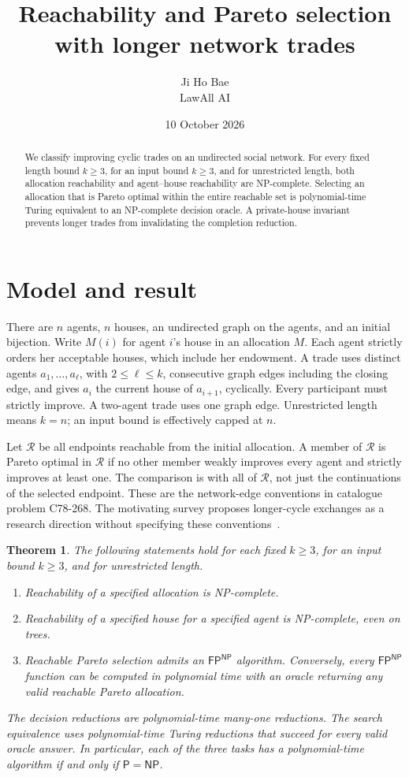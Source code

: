 \documentclass[11pt]{article}
\title{Reachability and Pareto selection with longer network trades}
\author{Ji Ho Bae\\\small LawAll AI}
\date{10 October 2026}
\newtheorem{theorem}{Theorem}
\newcommand{\NP}{\mathsf{NP}}
\newcommand{\FP}{\mathsf{FP}}
\newcommand{\RA}{\mathcal R}
\begin{document}
\maketitle
\begin{abstract}
We classify improving cyclic trades on an undirected social network.
For every fixed length bound $k\geq3$, for an input bound $k\geq3$,
and for unrestricted length, both allocation reachability and agent--house
reachability are NP-complete. Selecting an allocation that is Pareto
optimal within the entire reachable set is polynomial-time Turing
equivalent to an NP-complete decision oracle. A private-house invariant
prevents longer trades from invalidating the completion reduction.
\end{abstract}

\section{Model and result}
There are $n$ agents, $n$ houses, an undirected graph on the agents, and
an initial bijection. Write $M(i)$ for agent $i$'s house in an allocation $M$.
Each agent strictly orders her acceptable houses,
which include her endowment. A trade uses distinct agents
$a_1,\ldots,a_\ell$, with $2\leq\ell\leq k$, consecutive graph edges
including the closing edge, and gives $a_i$ the current house of
$a_{i+1}$, cyclically. Every participant must strictly improve.
A two-agent trade uses one graph edge. Unrestricted length means $k=n$;
an input bound is effectively capped at $n$.

Let $\RA$ be all endpoints reachable from the initial allocation.
A member of $\RA$ is Pareto optimal in $\RA$ if no other member weakly
improves every agent and strictly improves at least one. The comparison
is with all of $\RA$, not just the continuations of the selected endpoint.
These are the network-edge conventions in catalogue problem C78-268.
The motivating survey proposes longer-cycle exchanges as a research
direction without specifying these conventions~\cite[\S3.1.3]{survey}.

\begin{theorem}\label{main}
The following statements hold for each fixed $k\geq3$, for an input
bound $k\geq3$, and for unrestricted length.
\begin{enumerate}
\item Reachability of a specified allocation is NP-complete.
\item Reachability of a specified house for a specified agent is NP-complete,
      even on trees.
\item Reachable Pareto selection admits an $\FP^{\NP}$ algorithm.
      Conversely, every $\FP^{\NP}$ function can be computed in polynomial
      time with an oracle returning any valid reachable Pareto allocation.
\end{enumerate}
The decision reductions are polynomial-time many-one reductions. The
search equivalence uses polynomial-time Turing reductions that succeed
for every valid oracle answer. In particular, each of the three tasks
has a polynomial-time algorithm if and only if $\mathsf P=\NP$.
\end{theorem}
\end{document}
